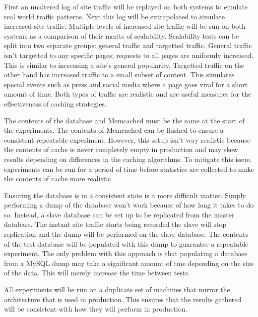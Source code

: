 \documentclass[12pt]{ucthesis}
\begin{document}
First an unaltered log of site traffic will be replayed on both systems to emulate real world traffic patterns.
Next this log will be extrapolated to simulate increased site traffic.
Multiple levels of increased site traffic will be run on both systems as a comparison of their merits of scalability.
Scalability tests can be split into two separate groups: general traffic and targetted traffic.
General traffic isn't targetted to any specific pages; requests to all pages are uniformly increased.
This is similar to increasing a site's general popularity.
Targetted traffic on the other hand has increased traffic to a small subset of content.
This simulates special events such as press and social media where a page goes viral for a short amount of time.
Both types of traffic are realistic and are useful measures for the effectiveness of caching strategies.

The contents of the database and {\textsf Memcached} must be the same at the start of the experiments.
The contents of {\textsf Memcached} can be flushed to ensure a consistent repeatable experiment.
However, this setup isn't very realistic because the contents of cache is never completely empty in production and may skew results depending on differences in the caching algorithms.
To mitigate this issue, experiments can be run for a period of time before statistics are collected to make the contents of cache more realistic.

Ensuring the database is in a consistent state is a more difficult matter.
Simply performing a dump of the database won't work because of how long it takes to do so.
Instead, a slave database can be set up to be replicated from the master database.
The instant site traffic starts being recorded the slave will stop replication and the dump will be performed on the slave database.
The contents of the test database will be populated with this dump to guarantee a repeatable experiment.
The only problem with this approach is that populating a database from a MySQL dump may take a significant amount of tme depending on the size of the data.
This will merely increase the time between tests.

All experiments will be run on a duplicate set of machines that mirror the architecture that is used in production.
This ensures that the results gathered will be consistent with how they will perform in production.



\clearpage


\end{document}
